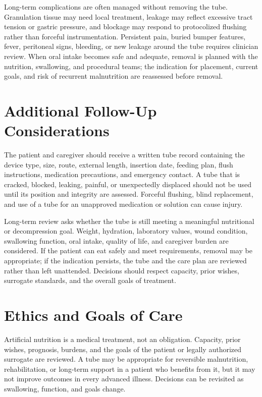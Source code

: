 Long-term complications are often managed without removing the tube. Granulation tissue may need local treatment, leakage may reflect excessive tract tension or gastric pressure, and blockage may respond to protocolized flushing rather than forceful instrumentation. Persistent pain, buried bumper features, fever, peritoneal signs, bleeding, or new leakage around the tube requires clinician review. When oral intake becomes safe and adequate, removal is planned with the nutrition, swallowing, and procedural teams; the indication for placement, current goals, and risk of recurrent malnutrition are reassessed before removal.

\section*{Additional Follow-Up Considerations}
The patient and caregiver should receive a written tube record containing the device type, size, route, external length, insertion date, feeding plan, flush instructions, medication precautions, and emergency contact. A tube that is cracked, blocked, leaking, painful, or unexpectedly displaced should not be used until its position and integrity are assessed. Forceful flushing, blind replacement, and use of a tube for an unapproved medication or solution can cause injury.

Long-term review asks whether the tube is still meeting a meaningful nutritional or decompression goal. Weight, hydration, laboratory values, wound condition, swallowing function, oral intake, quality of life, and caregiver burden are considered. If the patient can eat safely and meet requirements, removal may be appropriate; if the indication persists, the tube and the care plan are reviewed rather than left unattended. Decisions should respect capacity, prior wishes, surrogate standards, and the overall goals of treatment.

\section*{Ethics and Goals of Care}
Artificial nutrition is a medical treatment, not an obligation. Capacity, prior wishes, prognosis, burdens, and the goals of the patient or legally authorized surrogate are reviewed. A tube may be appropriate for reversible malnutrition, rehabilitation, or long-term support in a patient who benefits from it, but it may not improve outcomes in every advanced illness. Decisions can be revisited as swallowing, function, and goals change.

